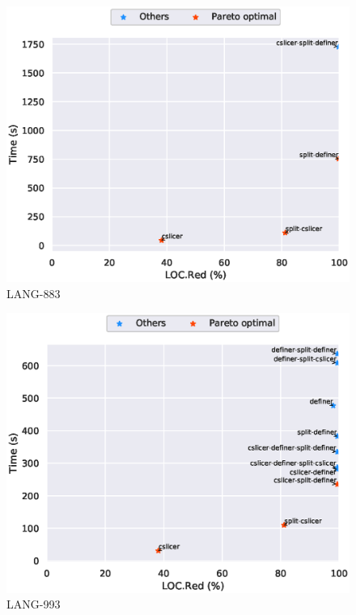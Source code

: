 \begin{figure}
\includegraphics[scale=0.7]{plots/pareto/LANG-883-pareto}
\caption{LANG-883}
\end{figure}
\begin{figure}
\includegraphics[scale=0.7]{plots/pareto/LANG-993-pareto}
\caption{LANG-993}
\end{figure}
